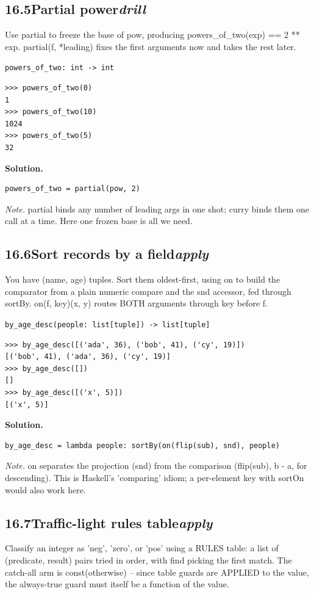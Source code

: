 \documentclass[10pt,letterpaper]{book}
\begin{document}
\subsection*{16.5\quad Partial power\hfill\textnormal{\textit{drill}}}
Use partial to freeze the base of pow, producing powers\_of\_two(exp) == 2 ** exp. partial(f, *leading) fixes the first arguments now and takes the rest later.

\noindent\texttt{powers\_of\_two: int -> int}
\begin{lstlisting}[style=ex]
>>> powers_of_two(0)
1
>>> powers_of_two(10)
1024
>>> powers_of_two(5)
32
\end{lstlisting}
\noindent\textbf{Solution.}
\begin{lstlisting}[style=code]
powers_of_two = partial(pow, 2)
\end{lstlisting}
\noindent\textit{Note.} partial binds any number of leading args in one shot; curry binds them one call at a time. Here one frozen base is all we need.

\subsection*{16.6\quad Sort records by a field\hfill\textnormal{\textit{apply}}}
You have (name, age) tuples. Sort them oldest-first, using on to build the comparator from a plain numeric compare and the snd accessor, fed through sortBy. on(f, key)(x, y) routes BOTH arguments through key before f.

\noindent\texttt{by\_age\_desc(people: list[tuple]) -> list[tuple]}
\begin{lstlisting}[style=ex]
>>> by_age_desc([('ada', 36), ('bob', 41), ('cy', 19)])
[('bob', 41), ('ada', 36), ('cy', 19)]
>>> by_age_desc([])
[]
>>> by_age_desc([('x', 5)])
[('x', 5)]
\end{lstlisting}
\noindent\textbf{Solution.}
\begin{lstlisting}[style=code]
by_age_desc = lambda people: sortBy(on(flip(sub), snd), people)
\end{lstlisting}
\noindent\textit{Note.} on separates the projection (snd) from the comparison (flip(sub), b - a, for descending). This is Haskell's 'comparing' idiom; a per-element key with sortOn would also work here.

\subsection*{16.7\quad Traffic-light rules table\hfill\textnormal{\textit{apply}}}
Classify an integer as 'neg', 'zero', or 'pos' using a RULES table: a list of (predicate, result) pairs tried in order, with find picking the first match. The catch-all arm is const(otherwise) -- since table guards are APPLIED to the value, the always-true guard must itself be a function of the value.
\end{document}
